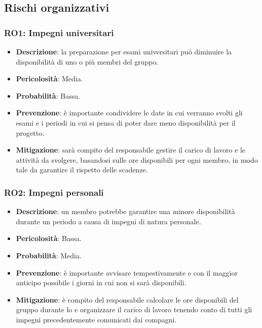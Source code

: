 \subsection{Rischi organizzativi}

\subsubsection{RO1: Impegni universitari}
\label{rischio:RO1}
\begin{itemize}
    \item \textbf{Descrizione}: la preparazione per esami universitari può diminuire la disponibilità di uno o più membri del gruppo.
    \item \textbf{Pericolosità}: Media.
    \item \textbf{Probabilità}: Bassa.
    \item \textbf{Prevenzione}: è importante condividere le date in cui verranno svolti gli esami e i periodi in cui si pensa di poter dare meno disponibilità per il progetto.
    \item \textbf{Mitigazione}: sarà compito del responsabile gestire il carico di lavoro e le attività da svolgere, basandosi sulle ore disponibili per ogni membro, in modo tale da garantire il rispetto delle scadenze. 
\end{itemize}

\subsubsection{RO2: Impegni personali}
\label{rischio:RO2}
\begin{itemize}
    \item \textbf{Descrizione}: un membro potrebbe garantire una minore disponibilità durante un periodo a causa di impegni di natura personale.
    \item \textbf{Pericolosità}: Bassa.
    \item \textbf{Probabilità}: Media.
    \item \textbf{Prevenzione}: è importante avvisare tempestivamente e con il maggior anticipo possibile i giorni in cui non si sarà disponibili. 
    \item \textbf{Mitigazione}: è compito del responsabile calcolare le ore disponibili del gruppo durante lo  e organizzare il carico di lavoro tenendo conto di tutti gli impegni precedentemente comunicati dai compagni. 
\end{itemize}

